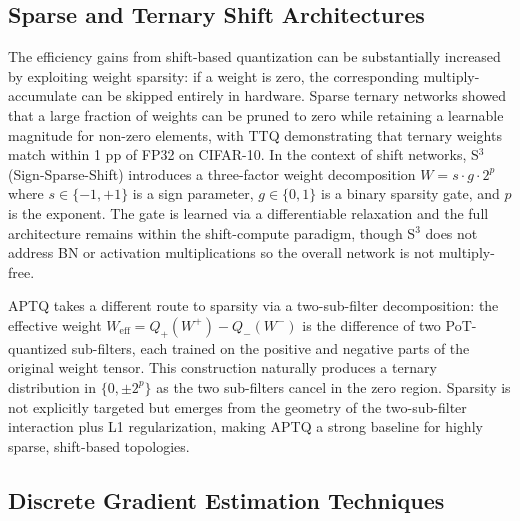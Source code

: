 \documentclass[12pt]{article}
\begin{document}
\subsection{Sparse and Ternary Shift Architectures}

The efficiency gains from shift-based quantization can be substantially increased by exploiting weight sparsity: if a weight is zero, the corresponding multiply-accumulate can be skipped entirely in hardware. Sparse ternary networks showed that a large fraction of weights can be pruned to zero while retaining a learnable magnitude for non-zero elements, with TTQ \cite{zhu2016ttq} demonstrating that ternary weights match within 1 pp of FP32 on CIFAR-10. In the context of shift networks, S$^3$ (Sign-Sparse-Shift) \cite{li2021s3} introduces a three-factor weight decomposition $W = s \cdot g \cdot 2^p$ where $s \in \{-1,+1\}$ is a sign parameter, $g \in \{0,1\}$ is a binary sparsity gate, and $p$ is the exponent. The gate is learned via a differentiable relaxation and the full architecture remains within the shift-compute paradigm, though S$^3$ does not address BN or activation multiplications so the overall network is not multiply-free.

APTQ \cite{liu2024aptq} takes a different route to sparsity via a two-sub-filter decomposition: the effective weight $W_\text{eff} = Q_+(W^+) - Q_-(W^-)$ is the difference of two PoT-quantized sub-filters, each trained on the positive and negative parts of the original weight tensor. This construction naturally produces a ternary distribution in $\{0, \pm 2^p\}$ as the two sub-filters cancel in the zero region. Sparsity is not explicitly targeted but emerges from the geometry of the two-sub-filter interaction plus L1 regularization, making APTQ a strong baseline for highly sparse, shift-based topologies.

\subsection{Discrete Gradient Estimation Techniques}
\end{document}
